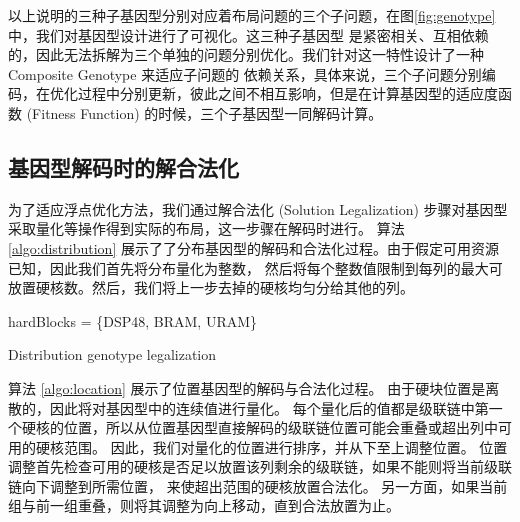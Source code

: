 以上说明的三种子基因型分别对应着布局问题的三个子问题，在图\ref{fig:genotype}中，我们对基因型设计进行了可视化。这三种子基因型
是紧密相关、互相依赖的，因此无法拆解为三个单独的问题分别优化。我们针对这一特性设计了一种 Composite Genotype 来适应子问题的
依赖关系，具体来说，三个子问题分别编码，在优化过程中分别更新，彼此之间不相互影响，但是在计算基因型的适应度函数 (Fitness Function)
的时候，三个子基因型一同解码计算。


\subsection{基因型解码时的解合法化}

为了适应浮点优化方法，我们通过解合法化 (Solution Legalization) 步骤对基因型采取量化等操作得到实际的布局，这一步骤在解码时进行。
算法 \ref{algo:distribution} 展示了了分布基因型的解码和合法化过程。由于假定可用资源已知，因此我们首先将分布量化为整数，
然后将每个整数值限制到每列的最大可放置硬核数。然后，我们将上一步去掉的硬核均匀分给其他的列。

\begin{algorithm}
	
	hardBlocks = \{DSP48, BRAM, URAM\}\;

	\caption{Distribution genotype legalization}
	\label{algo:distribution}
\end{algorithm}

算法 \ref{algo:location} 展示了位置基因型的解码与合法化过程。
由于硬块位置是离散的，因此将对基因型中的连续值进行量化。
每个量化后的值都是级联链中第一个硬核的位置，所以从位置基因型直接解码的级联链位置可能会重叠或超出列中可用的硬核范围。
因此，我们对量化的位置进行排序，并从下至上调整位置。
位置调整首先检查可用的硬核是否足以放置该列剩余的级联链，如果不能则将当前级联链向下调整到所需位置，
来使超出范围的硬核放置合法化。
另一方面，如果当前组与前一组重叠，则将其调整为向上移动，直到合法放置为止。

